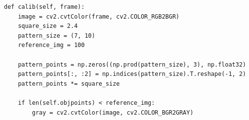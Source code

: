 \begin{lstlisting}[caption=calibration code,label=calib_code]
def calib(self, frame):                                                                                                                                      
    image = cv2.cvtColor(frame, cv2.COLOR_RGB2BGR)                                                                                                           
    square_size = 2.4                                                                                                                                        
    pattern_size = (7, 10)                                                                                                                                   
    reference_img = 100                                                                                                                                      
                                                                                                                                                            
    pattern_points = np.zeros((np.prod(pattern_size), 3), np.float32)                                                                                        
    pattern_points[:, :2] = np.indices(pattern_size).T.reshape(-1, 2)                                                                                        
    pattern_points *= square_size                                                                                                                            
                                                                                                                                                            
    if len(self.objpoints) < reference_img:                                                                                                                  
        gray = cv2.cvtColor(image, cv2.COLOR_BGR2GRAY)                                                                                                       
                                                                                                                                                            

\end{lstlisting}
